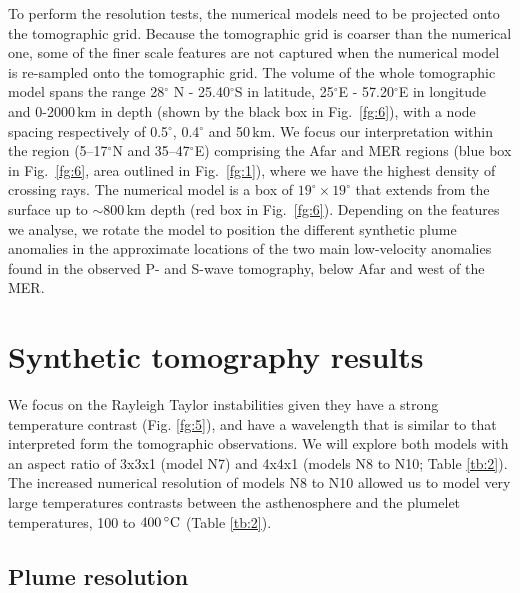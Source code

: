\documentclass[a4paper,10pt,twocolumn]{paper}
\begin{document}
To perform the resolution tests, the numerical models need to be projected onto the tomographic grid. Because the tomographic grid is coarser than the numerical one, some of the finer scale features are not captured when the numerical model is re-sampled onto the tomographic grid. The volume of the whole tomographic model spans the range 28$^{\circ}$ N - 25.40$^{\circ}$S in latitude, 25$^{\circ}$E - 57.20$^{\circ}$E in longitude and 0-2000\,km in depth (shown by the black box in Fig.~\ref{fg:6}), with a node spacing respectively of 0.5$^{\circ}$, 0.4$^{\circ}$ and 50\,km. We focus our interpretation within the region (5–17$^{\circ}$N and 35–47$^{\circ}$E) comprising the Afar and MER regions (blue box in Fig.~\ref{fg:6}, area outlined in Fig.~\ref{fg:1}), where we have the highest density of crossing rays. The numerical model is a box of $19^{\circ} \times 19^{\circ}$ that extends from the surface up to $\sim800$\,km depth (red box in Fig.~\ref{fg:6}). Depending on the features we analyse, we rotate the model to position the different synthetic plume anomalies in the approximate locations of the two main low-velocity anomalies found in the observed P- and S-wave tomography, below Afar and west of the MER.

\section{Synthetic tomography results}

We focus on the Rayleigh Taylor instabilities given they have a strong temperature contrast (Fig. \ref{fg:5}), and have a wavelength that is similar to that interpreted form the tomographic observations. We will explore both models with an aspect ratio of 3x3x1 (model N7) and 4x4x1 (models N8 to N10; Table \ref{tb:2}). The increased numerical resolution of models N8 to N10 allowed us to model very large temperatures contrasts between the asthenosphere and the plumelet temperatures, 100 to $400\rm\,^{\circ}C$ (Table \ref{tb:2}).

\subsection{Plume resolution}
\end{document}
